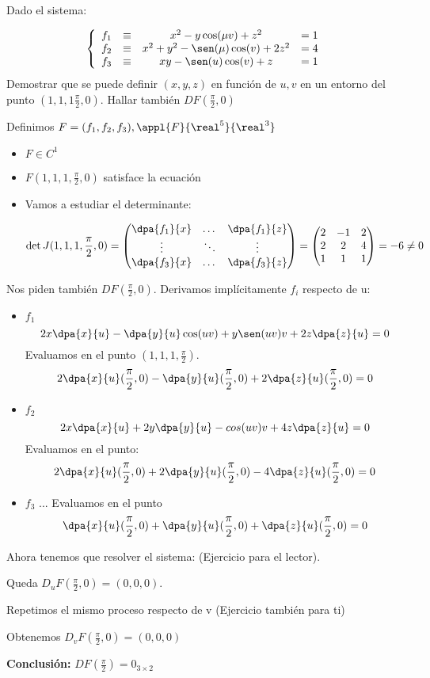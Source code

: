 \begin{problem}[19]
Dado el sistema:

\[\left\{\begin{array}{cccc}
	 f_1 &\equiv& x^2 -y\cos(\mu v) + z^2 &= 1\\
	f_2 &\equiv &x^2+y^2-\sen(\mu)\cos(v)+2z^2 &= 4\\
	f_3 &\equiv &xy-\sen(u)\cos(v) + z &= 1 \end{array} \right.\]
Demostrar que se puede definir $(x,y,z)$ en función de $u,v$ en un entorno del punto $(1,1,1\frac{\pi}{2},0) $. Hallar también $DF(\frac{\pi}{2},0) $

\solution
	
Definimos $F = (f_1,f_2,f_3), \appl{F}{\real^5}{\real^3}$

\begin{itemize}
\item $F \in C^1$
\item $F(1,1,1,\frac{\pi}{2},0)$ satisface la ecuación
\item Vamos a estudiar el determinante:

\[\det J(1,1,1,\frac{\pi}{2},0) = 
	\begin{pmatrix}
		\dpa{f_1}{x} &\dots &\dpa{f_1}{z}\\
		\vdots & \ddots &\vdots\\
		\dpa{f_3}{x} & \dots & \dpa{f_3}{z}
	\end{pmatrix} =
	\begin{pmatrix}
		2&-1&2\\
		2&2&4\\
		1&1&1
	\end{pmatrix} = -6 \neq 0\]	
\end{itemize}

Nos piden también $DF(\frac{\pi}{2},0)$. Derivamos implícitamente $f_i$ respecto de u:

\begin{itemize}
\item $f_1$
\[2x\dpa{x}{u} - \dpa{y}{u}\cos(uv)+y\sen(uv)v + 2z\dpa{z}{u} =0\]
Evaluamos en el punto $(1,1,1,\frac{\pi}{2})$.
\[2\dpa{x}{u}(\frac{\pi}{2},0) - \dpa{y}{u}(\frac{\pi}{2},0) + 2 \dpa{z}{u}(\frac{\pi}{2},0) = 0\]
 \item $f_2$
 \[2x\dpa{x}{u} + 2y\dpa{y}{u}-cos(uv)v+4z\dpa{z}{u} = 0\]
 Evaluamos en el punto:
 \[2\dpa{x}{u} (\frac{\pi}{2},0)  + 2\dpa{y}{u}(\frac{\pi}{2},0)  - 4 \dpa{z}{u}(\frac{\pi}{2},0) = 0 \]
 \item $f_3$
 ...
 Evaluamos en el punto
 \[\dpa{x}{u}(\frac{\pi}{2},0) +\dpa{y}{u}(\frac{\pi}{2},0)  + \dpa{z}{u}(\frac{\pi}{2},0) = 0 \]
\end{itemize}

Ahora tenemos que resolver el sistema:
(Ejercicio para el lector). 

Queda $D_uF(\frac{\pi}{2},0)  = (0,0,0)$.

Repetimos el mismo proceso respecto de v (Ejercicio también para ti)

Obtenemos $D_vF(\frac{\pi}{2},0)  = (0,0,0)$

\textbf{Conclusión:} $DF(\frac{\pi}{2}) = 0_{3\times 2}$
\end{problem}
 
